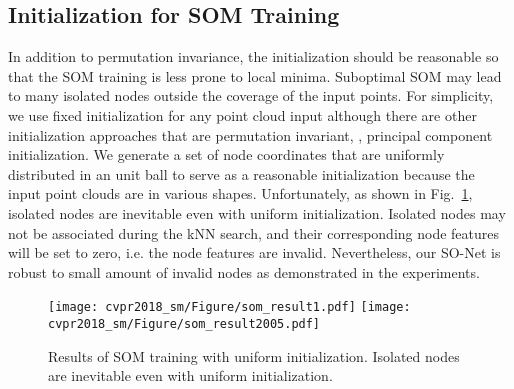 \documentclass[10pt,twocolumn,letterpaper]{article}
\begin{document}
\subsection{Initialization for SOM Training}
In addition to permutation invariance, the initialization should be reasonable so that the SOM training is less prone to local minima. Suboptimal SOM may lead to many isolated nodes outside the coverage of the input points. 
For simplicity, we use fixed initialization for any point cloud input
although there are other initialization approaches that are permutation invariant, \eg, principal component initialization. We generate a set of node coordinates that are uniformly distributed in an unit ball to serve as a reasonable initialization because the input point clouds are in various shapes. Unfortunately,
as shown in Fig.~\ref{fig_som_results},
isolated nodes are inevitable even with uniform initialization. 
Isolated nodes may not be associated during the kNN search, and their corresponding node features will be set to zero, i.e. the node features are invalid. Nevertheless, our SO-Net is robust to small amount of invalid nodes as demonstrated in the experiments.

\begin{figure}[t]
        \centering
        \texttt{[image: cvpr2018\_sm/Figure/som\_result1.pdf]}
        \texttt{[image: cvpr2018\_sm/Figure/som\_result2005.pdf]}
        \caption{ Results of SOM training with uniform initialization. Isolated nodes are inevitable even with uniform initialization.} \label{fig_som_results}
        \vspace{-4pt}
\end{figure}
\end{document}
